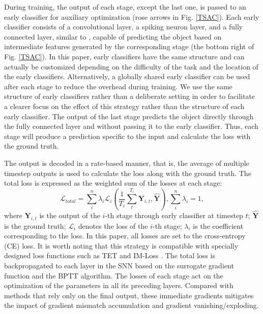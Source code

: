 \documentclass[letterpaper]{article} %
\begin{document}
During training, the output of each stage, except the last one, is passed to an early classifier for auxiliary optimization (rose arrows in Fig. \ref{TSAC}). Each early classifier consists of a convolutional layer, a spiking neuron layer, and a fully connected layer, similar to \cite{BranchyNet}, capable of predicting the object based on intermediate features generated by the corresponding stage (the bottom right of Fig. \ref{TSAC}). In this paper, early classifiers have the same structure and can actually be customized depending on the difficulty of the task and the location of the early classifiers. Alternatively, a globally shared early classifier can be used after each stage to reduce the overhead during training. We use the same structure of early classifiers rather than a deliberate setting in order to facilitate a clearer focus on the effect of this strategy rather than the structure of each early classifier. The output of the last stage predicts the object directly through the fully connected layer and without passing it to the early classifier. Thus, each stage will produce a prediction specific to the input and calculate the loss with the ground truth. 

The output is decoded in a rate-based manner, that is, the average of multiple timestep outputs is used to calculate the loss along with the ground truth. The total loss is expressed as the weighted sum of the losses at each stage:
\begin{equation}
\mathcal{L}_{total}=\sum_i^n {\lambda_i \mathcal{L}_i(\frac{1}{T_i}\sum_t^{T_i} {\boldsymbol{Y}_{i,t},\hat{\boldsymbol{Y}}})},
\sum_i^n \lambda_i = 1,
\label{eq14}
\end{equation}
where $\boldsymbol{Y}_{i,t}$ is the output of the $i$-th stage through early classifier at timestep $t$; $\hat{\boldsymbol{Y}}$ is the ground truth; $\mathcal{L}_i$ denotes the loss of the $i$-th stage; $\lambda_i$ is the coefficient corresponding to the loss. In this paper, all losses are set to the cross-entropy (CE) loss. It is worth noting that this strategy is compatible with specially designed loss functions such as TET \cite{TET} and IM-Loss \cite{NEURIPS2022_010c5ba0}. The total loss is backpropagated to each layer in the SNN based on the surrogate gradient function and the BPTT algorithm. 
The losses of each stage act on the optimization of the parameters in all its preceding layers. Compared with methods that rely only on the final output, these immediate gradients mitigates the impact of gradient mismatch accumulation and gradient vanishing/exploding.
\end{document}
